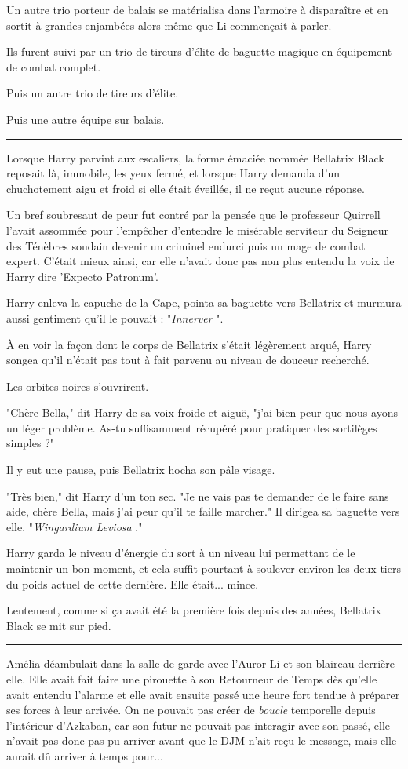 Un autre trio porteur de balais se matérialisa dans l'armoire à disparaître et en sortit à grandes enjambées alors même que Li commençait à parler.

Ils furent suivi par un trio de tireurs d'élite de baguette magique en équipement de combat complet.

Puis un autre trio de tireurs d'élite.

Puis une autre équipe sur balais.
\par\noindent\rule{\textwidth}{0.4pt}
Lorsque Harry parvint aux escaliers, la forme émaciée nommée Bellatrix Black reposait là, immobile, les yeux fermé, et lorsque Harry demanda d'un chuchotement aigu et froid si elle était éveillée, il ne reçut aucune réponse.

Un bref soubresaut de peur fut contré par la pensée que le professeur Quirrell l'avait assommée pour l'empêcher d'entendre le misérable serviteur du Seigneur des Ténèbres soudain devenir un criminel endurci puis un mage de combat expert. C'était mieux ainsi, car elle n'avait donc pas non plus entendu la voix de Harry dire 'Expecto Patronum'.

Harry enleva la capuche de la Cape, pointa sa baguette vers Bellatrix et murmura aussi gentiment qu'il le pouvait : "\emph{Innerver} ".

À en voir la façon dont le corps de Bellatrix s'était légèrement arqué, Harry songea qu'il n'était pas tout à fait parvenu au niveau de douceur recherché.

Les orbites noires s'ouvrirent.

"Chère Bella," dit Harry de sa voix froide et aiguë, "j'ai bien peur que nous ayons un léger problème. As-tu suffisamment récupéré pour pratiquer des sortilèges simples ?"

Il y eut une pause, puis Bellatrix hocha son pâle visage.

"Très bien," dit Harry d'un ton sec. "Je ne vais pas te demander de le faire sans aide, chère Bella, mais j'ai peur qu'il te faille marcher." Il dirigea sa baguette vers elle. "\emph{Wingardium Leviosa} ."

Harry garda le niveau d'énergie du sort à un niveau lui permettant de le maintenir un bon moment, et cela suffit pourtant à soulever environ les deux tiers du poids actuel de cette dernière. Elle était... mince.

Lentement, comme si ça avait été la première fois depuis des années, Bellatrix Black se mit sur pied.
\par\noindent\rule{\textwidth}{0.4pt}
Amélia déambulait dans la salle de garde avec l'Auror Li et son blaireau derrière elle. Elle avait fait faire une pirouette à son Retourneur de Temps dès qu'elle avait entendu l'alarme et elle avait ensuite passé une heure fort tendue à préparer ses forces à leur arrivée. On ne pouvait pas créer de \emph{boucle}  temporelle depuis l'intérieur d'Azkaban, car son futur ne pouvait pas interagir avec son passé, elle n'avait pas donc pas pu arriver avant que le DJM n'ait reçu le message, mais elle aurait dû arriver à temps pour...

